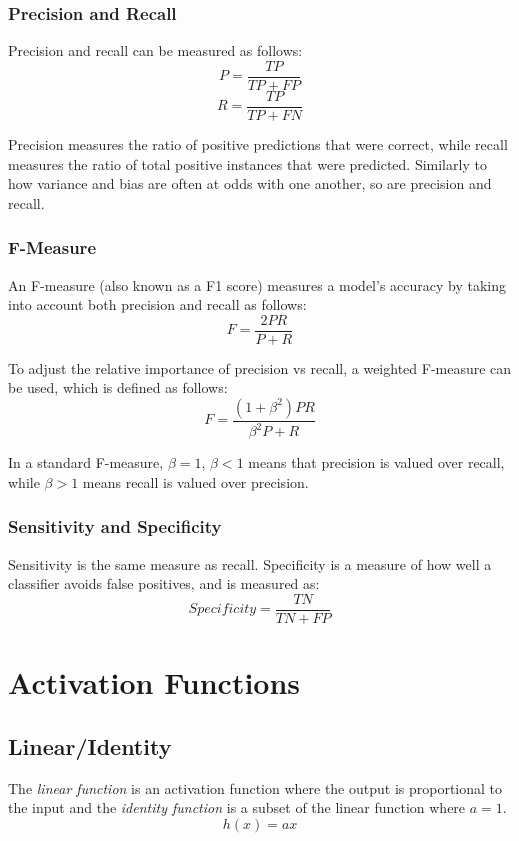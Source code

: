 \documentclass[12pt]{article}
\begin{document}
        \subsubsection{Precision and Recall}
            Precision and recall can be measured as follows:
            $$P = \frac{TP}{TP + FP}$$
            $$R = \frac{TP}{TP + FN}$$
    
            Precision measures the ratio of positive predictions that were correct, while recall measures the ratio of
            total positive instances that were predicted. Similarly to how variance and bias are often at odds with one
            another, so are precision and recall.
    
        \subsubsection{F-Measure}
            An F-measure (also known as a F1 score) measures a model's accuracy by taking into account both precision
            and recall as follows:
            $$F = \frac{2PR}{P + R}$$
    
            To adjust the relative importance of precision vs recall, a weighted F-measure can be used, which is defined
            as follows:
            $$F = \frac{(1 + \beta^2)PR}{\beta^2 P + R}$$
    
            In a standard F-measure, $\beta = 1$, $\beta < 1$ means that precision is valued over recall, while $\beta >
            1$ means recall is valued over precision.
    
        \subsubsection{Sensitivity and Specificity}
            Sensitivity is the same measure as recall. Specificity is a measure of how well a classifier avoids false
            positives, and is measured as:
            $$Specificity = \frac{TN}{TN + FP}$$

\section{Activation Functions} \label{sec:ActivationFunction}
    \subsection{Linear/Identity} \label{sec:Identity}
        The \textit{linear function} is an activation function where the output is proportional to the input and the
        \textit{identity function} is a subset of the linear function where $a = 1$. 
        $$ h(x) = ax $$
\end{document}
